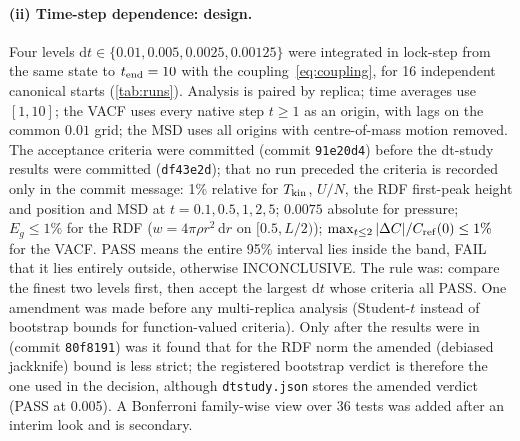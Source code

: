 \documentclass[11pt]{article}
\DeclareRobustCommand{\_}{\textunderscore\allowbreak}
\theoremstyle{remark}
\theoremstyle{definition}
\newcommand{\dd}{\,\mathrm{d}}
\begin{document}
\paragraph{(ii) Time-step dependence: design.}
Four levels $\mathrm dt\in\{0.01,0.005,0.0025,0.00125\}$ were integrated in lock-step from the same state to $t_{\rm end}=10$
with the coupling~\eqref{eq:coupling}, for 16 independent canonical starts (\cref{tab:runs}). Analysis is paired by
replica; time averages use $[1,10]$; the VACF uses every native step $t\ge1$ as an origin, with lags on the common $0.01$ grid; the MSD uses all origins with
centre-of-mass motion removed. The acceptance criteria were committed (commit \texttt{91e20d4}) before the dt-study results were committed
(\texttt{df43e2d}); that no run preceded the criteria is recorded only in the commit message: 1\% relative for $T_{\rm kin}$, $U/N$, the RDF first-peak height and position and MSD at
$t=0.1,0.5,1,2,5$; $0.0075$ absolute for pressure; $E_g\le1\%$ for the RDF ($w=4\pi\rho r^2\dd r$ on $[0.5,L/2)$);
$\max_{t\le2}|\Delta C|/C_{\rm ref}(0)\le1\%$ for the VACF. PASS means the entire 95\% interval lies inside the band, FAIL
that it lies entirely outside, otherwise INCONCLUSIVE. The rule was: compare the finest two levels first, then accept the
largest $\mathrm dt$ whose criteria all PASS. One amendment was made before any multi-replica analysis (Student-$t$ instead of
bootstrap bounds for function-valued criteria). Only after the results were in (commit \texttt{80f8191}) was it found that for
the RDF norm the amended (debiased jackknife) bound is less strict; the registered bootstrap verdict is therefore the one used in
the decision, although \texttt{dt\_study.json} stores the amended verdict (PASS at 0.005). A Bonferroni family-wise view over 36 tests was added
after an interim look and is secondary.
\end{document}
